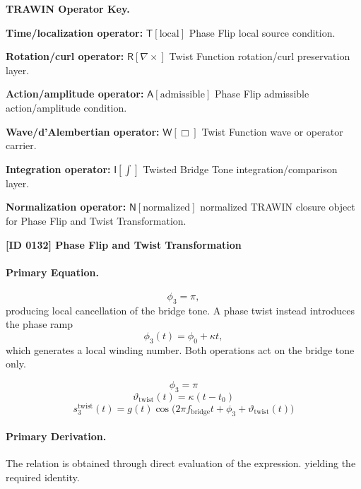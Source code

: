 \par\vspace{0.45\baselineskip}
\noindent\begin{minipage}[t]{\linewidth}
\begingroup
\small
\raggedright
\textbf{TRAWIN Operator Key.}\par
\noindent\textbf{Time/localization operator:} $\mathsf{T}\!\left[\mathrm{local}\right]$ Phase Flip local source condition.\par
\noindent\textbf{Rotation/curl operator:} $\mathsf{R}\!\left[\nabla\times\right]$ Twist Function rotation/curl preservation layer.\par
\noindent\textbf{Action/amplitude operator:} $\mathsf{A}\!\left[\mathrm{admissible}\right]$ Phase Flip admissible action/amplitude condition.\par
\noindent\textbf{Wave/d'Alembertian operator:} $\mathsf{W}\!\left[\Box\right]$ Twist Function wave or operator carrier.\par
\noindent\textbf{Integration operator:} $\mathsf{I}\!\left[\int\right]$ Twisted Bridge Tone integration/comparison layer.\par
\noindent\textbf{Normalization operator:} $\mathsf{N}\!\left[\mathrm{normalized}\right]$ normalized TRAWIN closure object for Phase Flip and Twist Transformation.\par
\endgroup
\end{minipage}

\clearpage
\noindent\textbf{[ID 0132] Phase Flip and Twist Transformation}\par
\vspace{0.35em}
\paragraph{Primary Equation.}
\[ \phi_3 = \pi, \] producing local cancellation of the bridge tone. A phase twist instead introduces the phase ramp \[ \phi_3(t) = \phi_0 + \kappa t, \] which generates a local winding number. Both operations act on the bridge tone only.

\[
\phi_3=\pi
\]
\[
\vartheta_{\mathrm{twist}}(t)=\kappa (t-t_0)
\]
\[
s_3^{\mathrm{twist}}(t)=g(t)\cos\!\bigl(2\pi f_{\mathrm{bridge}} t+\phi_3+\vartheta_{\mathrm{twist}}(t)\bigr)
\]

\paragraph{Primary Derivation.}
The relation is obtained through direct evaluation of the expression. yielding the required identity.
